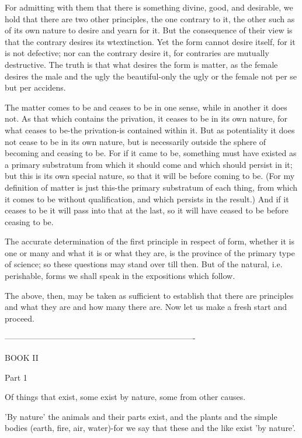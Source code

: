 For admitting with them that there is something divine, good, and
desirable, we hold that there are two other principles, the one contrary
to it, the other such as of its own nature to desire and yearn for
it. But the consequence of their view is that the contrary desires
its wtextinction. Yet the form cannot desire itself, for it is not
defective; nor can the contrary desire it, for contraries are mutually
destructive. The truth is that what desires the form is matter, as
the female desires the male and the ugly the beautiful-only the ugly
or the female not per se but per accidens. 

The matter comes to be and ceases to be in one sense, while in another
it does not. As that which contains the privation, it ceases to be
in its own nature, for what ceases to be-the privation-is contained
within it. But as potentiality it does not cease to be in its own
nature, but is necessarily outside the sphere of becoming and ceasing
to be. For if it came to be, something must have existed as a primary
substratum from which it should come and which should persist in it;
but this is its own special nature, so that it will be before coming
to be. (For my definition of matter is just this-the primary substratum
of each thing, from which it comes to be without qualification, and
which persists in the result.) And if it ceases to be it will pass
into that at the last, so it will have ceased to be before ceasing
to be. 

The accurate determination of the first principle in respect of form,
whether it is one or many and what it is or what they are, is the
province of the primary type of science; so these questions may stand
over till then. But of the natural, i.e. perishable, forms we shall
speak in the expositions which follow. 

The above, then, may be taken as sufficient to establish that there
are principles and what they are and how many there are. Now let us
make a fresh start and proceed. 

----------------------------------------------------------------------

BOOK II

Part 1 

Of things that exist, some exist by nature, some from other causes.

'By nature' the animals and their parts exist, and the plants and
the simple bodies (earth, fire, air, water)-for we say that these
and the like exist 'by nature'. 

